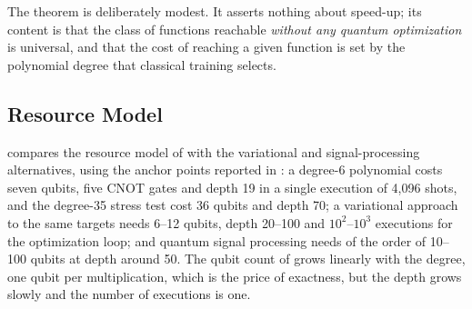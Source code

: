 The theorem is deliberately modest. It asserts nothing about speed-up; its content is that the class of functions reachable \emph{without any quantum optimization} is universal, and that the cost of reaching a given function is set by the polynomial degree that classical training selects.

\subsection{Resource Model}\label{sec:qml:nnqa:resources}

 compares the resource model of \nnqa{} with the variational and signal-processing alternatives, using the anchor points reported in \cite{guo2026nnqa}: a degree-6 polynomial costs \nnqa{} seven qubits, five CNOT gates and depth 19 in a single execution of 4,096 shots, and the degree-35 stress test cost 36 qubits and depth 70; a variational approach to the same targets needs 6--12 qubits, depth 20--100 and $10^2$--$10^3$ executions for the optimization loop; and quantum signal processing needs of the order of 10--100 qubits at depth around 50. The qubit count of \nnqa{} grows linearly with the degree, one qubit per multiplication, which is the price of exactness, but the depth grows slowly and the number of executions is one.

